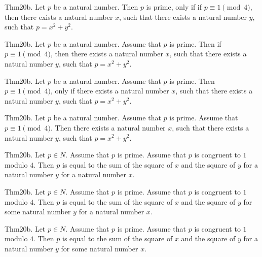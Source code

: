 \documentclass{article}
\begin{document}
Thm20b. Let $p$ be a natural number. Then $p$ is prime, only if if $p \equiv 1 \pmod{ 4}$, then there exists a natural number $x$, such that there exists a natural number $y$, such that $p = x ^{ 2}+ y ^{ 2}$.

Thm20b. Let $p$ be a natural number. Assume that $p$ is prime. Then if $p \equiv 1 \pmod{ 4}$, then there exists a natural number $x$, such that there exists a natural number $y$, such that $p = x ^{ 2}+ y ^{ 2}$.

Thm20b. Let $p$ be a natural number. Assume that $p$ is prime. Then $p \equiv 1 \pmod{ 4}$, only if there exists a natural number $x$, such that there exists a natural number $y$, such that $p = x ^{ 2}+ y ^{ 2}$.

Thm20b. Let $p$ be a natural number. Assume that $p$ is prime. Assume that $p \equiv 1 \pmod{ 4}$. Then there exists a natural number $x$, such that there exists a natural number $y$, such that $p = x ^{ 2}+ y ^{ 2}$.

Thm20b. Let $p \in N$. Assume that $p$ is prime. Assume that $p$ is congruent to $1$ modulo $4$. Then $p$ is equal to the sum of the square of $x$ and the square of $y$ for a natural number $y$ for a natural number $x$.

Thm20b. Let $p \in N$. Assume that $p$ is prime. Assume that $p$ is congruent to $1$ modulo $4$. Then $p$ is equal to the sum of the square of $x$ and the square of $y$ for some natural number $y$ for a natural number $x$.

Thm20b. Let $p \in N$. Assume that $p$ is prime. Assume that $p$ is congruent to $1$ modulo $4$. Then $p$ is equal to the sum of the square of $x$ and the square of $y$ for a natural number $y$ for some natural number $x$.
\end{document}
